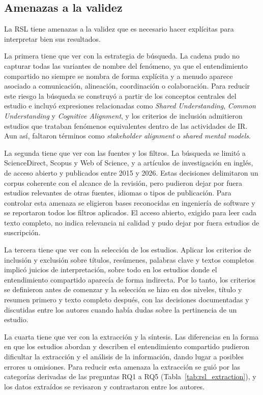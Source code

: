 \documentclass[12pt,letterpaper,oneside]{report}
\begin{document}
\subsection{Amenazas a la validez}
La RSL tiene amenazas a la validez que es necesario hacer explícitas para
interpretar bien sus resultados.

La primera tiene que ver con la estrategia de búsqueda. La cadena pudo no
capturar todas las variantes de nombre del fenómeno, ya que el entendimiento
compartido no siempre se nombra de forma explícita y a menudo aparece asociado
a comunicación, alineación, coordinación o colaboración. Para reducir este
riesgo la búsqueda se construyó a partir de los conceptos centrales del estudio e
incluyó expresiones relacionadas como \textit{Shared Understanding},
\textit{Common Understanding} y \textit{Cognitive Alignment}, y los criterios
de inclusión admitieron estudios que trataban fenómenos equivalentes dentro de
las actividades de IR. Aun así, faltaron términos como \textit{stakeholder
alignment} o \textit{shared mental models}.

La segunda tiene que ver con las fuentes y los filtros. La búsqueda se limitó a
ScienceDirect, Scopus y Web of Science, y a artículos de investigación en
inglés, de acceso abierto y publicados entre 2015 y 2026. Estas decisiones
delimitaron un corpus coherente con el alcance de la revisión, pero pudieron
dejar por fuera estudios relevantes de otras fuentes, idiomas o tipos de
publicación. Para controlar esta amenaza se eligieron bases reconocidas en
ingeniería de software y se reportaron todos los filtros aplicados. El acceso
abierto, exigido para leer cada texto completo, no indica relevancia ni calidad
y pudo dejar por fuera estudios de suscripción.

La tercera tiene que ver con la selección de los estudios. Aplicar los
criterios de inclusión y exclusión sobre títulos, resúmenes, palabras clave y
textos completos implicó juicios de interpretación, sobre todo en los estudios
donde el entendimiento compartido aparecía de forma indirecta. Por lo tanto,
los criterios se definieron antes de comenzar y la selección se hizo en dos
niveles, título y resumen primero y texto completo después, con las decisiones
documentadas y discutidas entre los autores cuando había dudas sobre la
pertinencia de un estudio.

La cuarta tiene que ver con la extracción y la síntesis. Las diferencias en la forma en que
 los estudios abordan y describen el entendimiento compartido pudieron dificultar la 
 extracción y el análisis de la información, dando lugar a posibles errores u omisiones. 
 Para reducir esta amenaza la extracción se guió por las
categorías derivadas de las preguntas RQ1 a RQ5 (Tabla~\ref{tab:rsl_extraction}),
y los datos extraídos se revisaron y contrastaron entre los autores.
\end{document}
